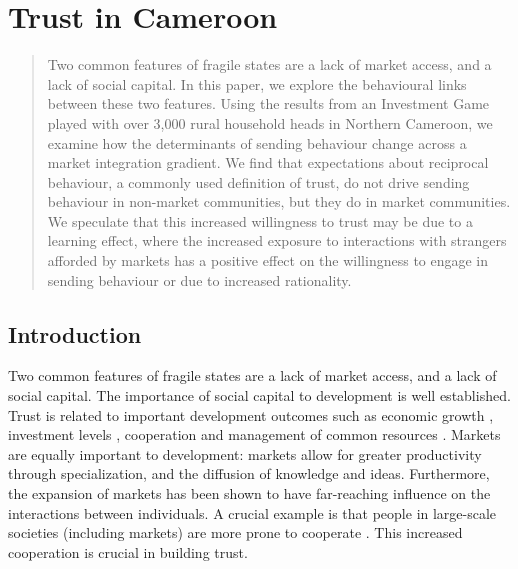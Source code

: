 \chapter{Trust in Cameroon}
\label{chap:cameroontrust}

\begin{abstract}
Two common features of fragile states are a lack of market access, and a lack of social capital. In this paper, we explore the behavioural links between these two features. Using the results from an Investment Game played with over 3,000 rural household heads in Northern Cameroon, we examine how the determinants of sending behaviour change across a market integration gradient. We find that expectations about reciprocal behaviour, a commonly used definition of trust, do not drive sending behaviour in non-market communities, but they do in market communities. We speculate that this increased willingness to trust may be due to a learning effect, where the increased exposure to interactions with strangers afforded by markets has a positive effect on the willingness to engage in sending behaviour or due to increased rationality.
\end{abstract}


\section{Introduction}

Two common features of fragile states are a lack of market access, and a lack of social capital. The importance of social capital to development is well established. Trust is related to important development outcomes such as economic growth \citep{Knack1997}, investment levels \citep{Zak2001}, cooperation \citep{Gachter2004,Sonderskov2011} and management of common resources \citep{Bouma2008}. Markets are equally important to development: markets allow for greater productivity through specialization, and the diffusion of knowledge and ideas. Furthermore, the expansion of markets has been shown to have far-reaching influence on the interactions between individuals. A crucial example is that people in large-scale societies (including markets) are more prone to cooperate \citep{Henrich2010}. This increased cooperation is crucial in building trust.

